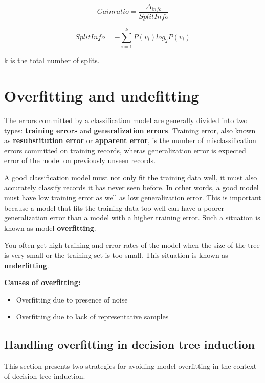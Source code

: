 		\begin{equation}
			Gain ratio = \frac{\Delta_{info}}{Split Info}
		\end{equation}

		\begin{equation}
			Split Info = - \sum_{i=1}^{k} P(v_{i})log_{2}P(v_{i})
		\end{equation}

		k is the total number of splits.

		\clearpage
		\section{Overfitting and undefitting}

		The errors committed by a classification model are generally divided into
		two types: {\bf training errors} and {\bf generalization errors}.
		Training error, also known as {\bf resubstitution error} or {\bf apparent error}, 
		is the number of misclassification errors committed on training records, wheras
		generalization error is expected error of the model on previously unseen records. 

		A good classification model must not only fit the training data well, it must
		also accurately classify records it has never seen before. In other words, 
		a good model must have low training error as well as low generalization error. 
		This is important because a model that fits the training data too well can 
		have a poorer generalization error than a model with a higher training error.
		Such a situation is known as model {\bf overfitting}.

		You often get high training and error rates of the model when the size of the
		tree is very small or the training set is too small. This situation is known 
		as {\bf underfitting}.

		{\bf Causes of overfitting:}
		\begin{itemize}
			\item Overfitting due to presence of noise
			\item Overfitting due to lack of representative samples
		\end{itemize}

		\subsection{Handling overfitting in decision tree induction}

		This section presents two strategies for avoiding model overfitting 
		in the context of decision tree induction. 

